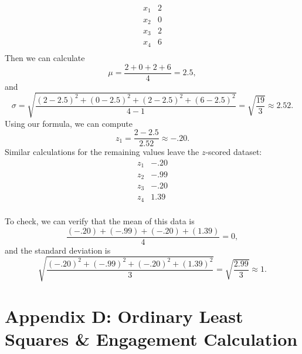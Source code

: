 \documentclass[12pt]{article}
\begin{document}
\[
\begin{array}{c|c}
   x_1 &  2  \\
   x_2 & 0  \\
  x_3 &  2 \\
  x_4 &   6 \\
\end{array}
\]
Then we can calculate
\[\mu = \frac{2+0+2+6}{4} = 2.5,\] and \[\sigma = \sqrt{\frac{(2-2.5)^2 + (0-2.5)^2 + (2-2.5)^2+(6-2.5)^2}{4-1}} = \sqrt{\frac{19}{3}} \approx 2.52. \]
Using our formula, we can compute
\[z_1 = \frac{2 - 2.5}{2.52} \approx -.20.\] Similar calculations for the remaining values leave the $z$-scored dataset:
\[
\begin{array}{c|c}
   z_1 &  -.20  \\
   z_2 & -.99 \\
  z_3 &  -.20 \\
  z_4 &   1.39 \\
\end{array}
\]

To check, we can verify that the mean of this data is
\[\frac{(-.20) + (-.99) + (-.20) + (1.39)}{4} = 0,\] and the standard deviation is
\[\sqrt{\frac{(-.20)^2 + (-.99)^2 + (-.20)^2 + (1.39)^2}{3}} = \sqrt{\frac{2.99}{3}} \approx 1.\]
\newpage
\section{Appendix D: Ordinary Least Squares \& Engagement Calculation}\label{appc}
\end{document}
